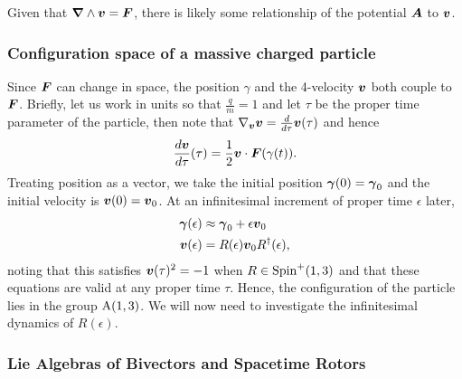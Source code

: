 \documentclass[conf]{new-aiaa}
\begin{document}
\begin{remark}
Given that $\boldsymbol{\nabla} \wedge \boldsymbol{v} = \boldsymbol{F}$, there is likely some relationship of the potential $\boldsymbol{A}$ to $\boldsymbol{v}$.
\end{remark}

\subsubsection{Configuration space of a massive charged particle}

Since $\boldsymbol{F}$ can change in space, the position $\gamma$ and the 4-velocity $\boldsymbol{v}$ both couple to $\boldsymbol{F}$. Briefly, let us work in units so that $\frac{q}{m}=1$ and let $\tau$ be the proper time parameter of the particle, then note that $\nabla_{\boldsymbol{v}}\boldsymbol{v}=\frac{d}{d\tau} \boldsymbol{v}(\tau)$ and hence
\begin{equation}
    \label{eq:faraday_transport}
    \frac{d\boldsymbol{v}}{d\tau} (\tau) = \frac{1}{2} \boldsymbol{v}\cdot \boldsymbol{F}(\gamma(t)).
\end{equation}
Treating position as a vector, we take the initial position $\boldsymbol{\gamma}(0)=\boldsymbol{\gamma}_0$ and the initial velocity is $\boldsymbol{v}(0)=\boldsymbol{v}_0$. At an infinitesimal increment of proper time $\epsilon$ later,
\begin{align}
\label{eq:linearization_position}
\boldsymbol{\gamma}(\epsilon) &\approx \boldsymbol{\gamma}_0+\epsilon\boldsymbol{v}_0\\
\boldsymbol{v}(\epsilon) &=  R(\epsilon)\boldsymbol{v}_0 R^\dagger(\epsilon),
\end{align}
noting that this satisfies $\boldsymbol{v}(\tau)^2=-1$ when $R\in \operatorname{Spin}^+(1,3)$ and that these equations are valid at any proper time $\tau$. Hence, the configuration of the particle lies in the group $\operatorname{A}(1,3)$. We will now need to investigate the infinitesimal dynamics of $R(\epsilon)$.

\subsubsection{Lie Algebras of Bivectors and Spacetime Rotors}
\end{document}
